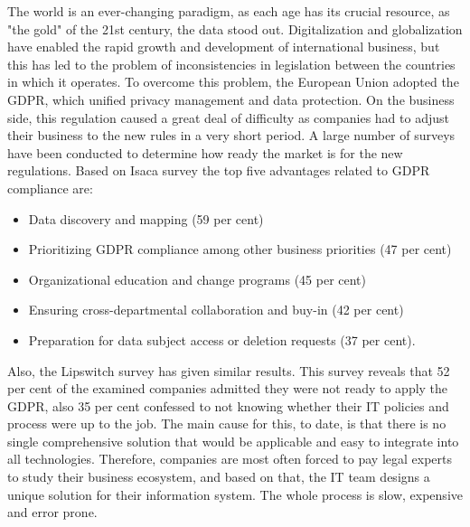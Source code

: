 \documentclass[11pt,english]{article}
\begin{document}
The world is an ever-changing paradigm, as each age has its crucial resource, as "the gold" of the 21st century, the data stood out. Digitalization and globalization have enabled the rapid growth and development of international business, but this has led to the problem of inconsistencies in legislation between the countries in which it operates. To overcome this problem, the European Union adopted the GDPR, which unified privacy management and data protection. On the business side, this regulation caused a great deal of difficulty as companies had to adjust their business to the new rules in a very short period. A large number of surveys have been conducted to determine how ready the market is for the new regulations. Based on Isaca survey \cite{isaca} the top five advantages related to GDPR compliance are:
\begin{itemize}
  \item Data discovery and mapping (59 per cent)
  \item Prioritizing GDPR compliance among other business priorities (47 per cent)
  \item Organizational education and change programs (45 per cent)
  \item Ensuring cross-departmental collaboration and buy-in (42 per cent)
  \item Preparation for data subject access or deletion requests (37 per cent).
\end{itemize}
 Also, the Lipswitch survey\cite{lipswitch} has given similar results. This survey reveals that 52 per cent of the examined companies admitted they were not ready to apply the GDPR, also 35 per cent confessed to not knowing whether their IT policies and process were up to the job. The main cause for this, to date, is that there is no single comprehensive solution that would be applicable and easy to integrate into all technologies. Therefore, companies are most often forced to pay legal experts to study their business ecosystem, and based on that, the IT team designs a unique solution for their information system. The whole process is slow, expensive and error prone.

\printbibliography
\end{document}
